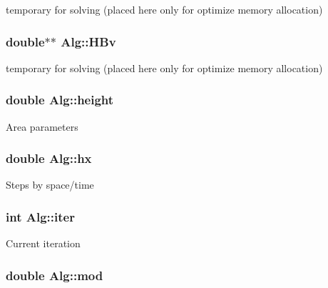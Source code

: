 \label{classAlg_ad2f2df479bdee0b098e959eb6750ad24}
temporary for solving (placed here only for optimize memory allocation) \hypertarget{classAlg_abf4332341084e55c633251179030c52f}{
\subsubsection[{HBv}]{\setlength{\rightskip}{0pt plus 5cm}double$\ast$$\ast$ {\bf Alg::HBv}}}
\label{classAlg_abf4332341084e55c633251179030c52f}
temporary for solving (placed here only for optimize memory allocation) \hypertarget{classAlg_a60c5daa9c7917681e7ef07f912dabbb5}{
\subsubsection[{height}]{\setlength{\rightskip}{0pt plus 5cm}double {\bf Alg::height}}}
\label{classAlg_a60c5daa9c7917681e7ef07f912dabbb5}
Area parameters \hypertarget{classAlg_a7baeb3f5e56097c1bcd1bdd7c248748a}{
\subsubsection[{hx}]{\setlength{\rightskip}{0pt plus 5cm}double {\bf Alg::hx}}}
\label{classAlg_a7baeb3f5e56097c1bcd1bdd7c248748a}
Steps by space/time \hypertarget{classAlg_a68d89159e07d755c5ec4235a10928674}{
\subsubsection[{iter}]{\setlength{\rightskip}{0pt plus 5cm}int {\bf Alg::iter}}}
\label{classAlg_a68d89159e07d755c5ec4235a10928674}
Current iteration \hypertarget{classAlg_a48f35bad3ab97c5bbabb1ecf572980e1}{
\subsubsection[{mod}]{\setlength{\rightskip}{0pt plus 5cm}double {\bf Alg::mod}}}
